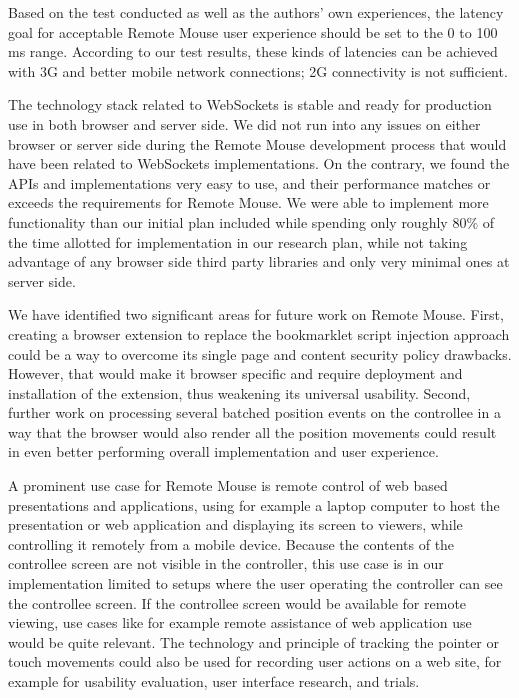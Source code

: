 \documentclass[a4paper,english,twocolumn,9pt]{extarticle}
\begin{document}
Based on the test conducted as well as the authors' own experiences,
the latency goal for acceptable Remote Mouse user experience should be
set to the 0 to 100 ms range. According to our test results, these
kinds of latencies can be achieved with 3G and better mobile network
connections; 2G connectivity is not sufficient.

The technology stack related to WebSockets is stable and ready for
production use in both browser and server side. We did not run into
any issues on either browser or server side during the Remote Mouse
development process that would have been related to WebSockets
implementations. On the contrary, we found the APIs and
implementations very easy to use, and their performance matches or
exceeds the requirements for Remote Mouse. We were able to implement
more functionality than our initial plan included while spending only
roughly 80\% of the time allotted for implementation in our research
plan, while not taking advantage of any browser side third party
libraries and only very minimal ones at server side.

We have identified two significant areas for future work on Remote
Mouse. First, creating a browser extension to replace the bookmarklet
script injection approach could be a way to overcome its single page
and content security policy drawbacks. However, that would make it
browser specific and require deployment and installation of the
extension, thus weakening its universal usability. Second, further
work on processing several batched position events on the controllee
in a way that the browser would also render all the position movements
could result in even better performing overall implementation and user
experience.

A prominent use case for Remote Mouse is remote control of web based
presentations and applications, using for example a laptop computer to
host the presentation or web application and displaying its screen to
viewers, while controlling it remotely from a mobile device. Because
the contents of the controllee screen are not visible in the
controller, this use case is in our implementation limited to setups
where the user operating the controller can see the controllee
screen. If the controllee screen would be available for remote
viewing, use cases like for example remote assistance of web
application use would be quite relevant. The technology and principle
of tracking the pointer or touch movements could also be used for
recording user actions on a web site, for example for usability
evaluation, user interface research, and trials.






\end{document}
